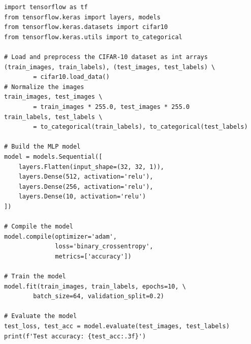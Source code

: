 \documentclass[12pt]{article}
\begin{document}
\begin{verbatim}
import tensorflow as tf
from tensorflow.keras import layers, models
from tensorflow.keras.datasets import cifar10
from tensorflow.keras.utils import to_categorical

# Load and preprocess the CIFAR-10 dataset as int arrays
(train_images, train_labels), (test_images, test_labels) \
        = cifar10.load_data()
# Normalize the images
train_images, test_images \
        = train_images * 255.0, test_images * 255.0
train_labels, test_labels \
        = to_categorical(train_labels), to_categorical(test_labels)

# Build the MLP model
model = models.Sequential([
    layers.Flatten(input_shape=(32, 32, 1)),
    layers.Dense(512, activation='relu'),
    layers.Dense(256, activation='relu'),
    layers.Dense(10, activation='relu')
])

# Compile the model
model.compile(optimizer='adam',
              loss='binary_crossentropy',
              metrics=['accuracy'])

# Train the model
model.fit(train_images, train_labels, epochs=10, \
        batch_size=64, validation_split=0.2)

# Evaluate the model
test_loss, test_acc = model.evaluate(test_images, test_labels)
print(f'Test accuracy: {test_acc:.3f}')
    \end{verbatim}
\end{document}
